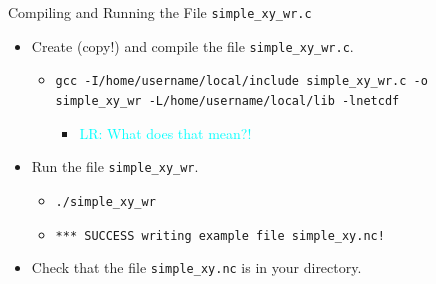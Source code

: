 \documentclass[compress,11pt,xcolor=svgnames,aspectratio=169]{beamer}
\newcommand{\lr}[1]{\textcolor{cyan}{LR: #1}}
\begin{document}
\begin{frame}[fragile]{Compiling and Running the File \texttt{simple\_xy\_wr.c}}

\begin{itemize}
\setlength\itemsep{0.6cm}

  \item Create (copy!) and compile the file \verb|simple_xy_wr.c|.

    \begin{itemize}
      \item {\tiny \verb|gcc -I/home/username/local/include simple_xy_wr.c -o simple_xy_wr -L/home/username/local/lib -lnetcdf|}
        \begin{itemize}
          \item \lr{What does that mean?!}
        \end{itemize}
    \end{itemize}

  \item Run the file \verb|simple_xy_wr|.

      \begin{itemize}

        \item {\tiny \verb|./simple_xy_wr|}\\

        \item {\tiny \verb|*** SUCCESS writing example file simple_xy.nc!|}\\[0.5cm]

      \end{itemize}

  \item Check that the file \verb|simple_xy.nc| is in your directory.

\end{itemize}

\end{frame}
\end{document}
